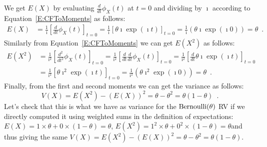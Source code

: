 \begin{example}
We get $E(X)$ by evaluating $\frac{d}{dt}\phi_X(t)$ at $t=0$ and dividing by $\imath$ according to Equation~\eqref{E:CFToMoments} as follows:
\begin{align*}
E(X)
&= \frac{1}{\imath} \left[ \frac{d}{dt}\phi_X(t) \right]_{t=0} 
= \frac{1}{\imath} \left[ \theta \imath \exp(\imath t) \right]_{t=0} 
= \frac{1}{\imath} \left( \theta \imath \exp(\imath 0) \right) 
=  \theta \enspace.
\end{align*}
Similarly from Equation~\eqref{E:CFToMoments} we can get $E(X^2)$ as follows:
\begin{align*}
E(X^2)
&= \frac{1}{\imath^2} \left[ \frac{d^2}{dt^2}\phi_X(t) \right]_{t=0} 
= \frac{1}{\imath^2} \left[ \frac{d}{dt} \frac{d}{dt} \phi_X(t) \right]_{t=0} 
= \frac{1}{\imath^2} \left[ \frac{d}{dt} \theta \imath \exp(\imath t) \right]_{t=0}\\ 
&= \frac{1}{\imath^2} \left[ \theta \imath^2 \exp(\imath t) \right]_{t=0} 
= \frac{1}{\imath^2} \left( \theta \imath^2 \exp(\imath 0) \right) 
=  \theta \enspace.
\end{align*}
Finally, from the first and second moments we can get the variance as follows:
\[
V(X) = E(X^2) - (E(X))^2 = \theta - \theta^2 = \theta(1-\theta) \enspace .
\]
Let's check that this is what we have as variance for the $\mbox{{\rm Bernoulli}}(\theta)$ RV if we directly computed it using weighted sums in the definition of expectations: $E(X)=1 \times \theta + 0 \times (1-\theta)=\theta$, $E(X^2) = 1^2 \times \theta + 0^2 \times (1-\theta)=\theta$and thus giving the same $V(X) = E(X^2) - (E(X))^2 = \theta - \theta^2 = \theta(1-\theta)$.
\end{example}

